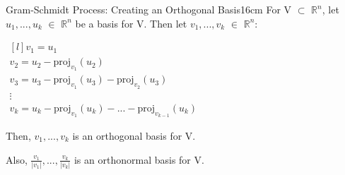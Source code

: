     \vspace{0.5cm}



    \begin{wtheorem}{Gram-Schmidt Process: Creating an Orthogonal Basis}{16cm}
        For V $\subset$ $\mathbb{R}^n$, let $u_1,...,u_k$ $\in$ $\mathbb{R}^n$
        be a basis for V. Then let $v_1,...,v_k$ $\in$ $\mathbb{R}^n$:

        \hspace{0.5cm}
        $\begin{matrix*}[l]
            v_1 = u_1 \\
            v_2 = u_2 - \text{proj}_{v_1}(u_2) \\
            v_3 = u_3 - \text{proj}_{v_1}(u_3) - \text{proj}_{v_2}(u_3) \\
            \vdots \\
            v_k = u_k - \text{proj}_{v_1}(u_k) - ... - \text{proj}_{v_{k-1}}(u_k)
        \end{matrix*}$

        Then, $v_1,...,v_k$ is an orthogonal basis for V.

        Also, $\frac{v_1}{|v_1|},...,\frac{v_k}{|v_k|}$ is an orthonormal
        basis for V.
    \end{wtheorem}

